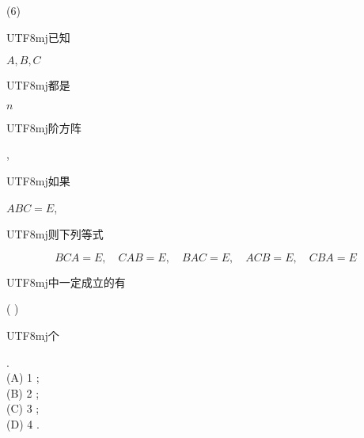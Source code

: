 \documentclass[10pt]{article}
\begin{document}
(6) \begin{CJK}{UTF8}{mj}已知\end{CJK} $A, B, C$ \begin{CJK}{UTF8}{mj}都是\end{CJK} $n$ \begin{CJK}{UTF8}{mj}阶方阵\end{CJK}, \begin{CJK}{UTF8}{mj}如果\end{CJK} $A B C=E$, \begin{CJK}{UTF8}{mj}则下列等式\end{CJK}
$$
B C A=E, \quad C A B=E, \quad B A C=E, \quad A C B=E, \quad C B A=E
$$
\begin{CJK}{UTF8}{mj}中一定成立的有\end{CJK} ( ) \begin{CJK}{UTF8}{mj}个\end{CJK}.\\
(A) 1 ;\\
(B) 2 ;\\
(C) 3 ;\\
(D) 4 .
\end{document}
